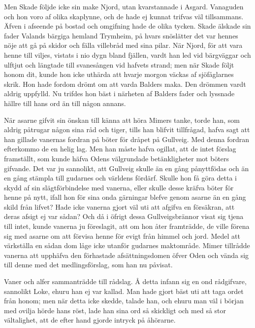 Men Skade följde icke sin make Njord, utan kvarstannade i Asgard.
Vanaguden och hon voro af olika skaplynne, och de hade ej kunnat trifvas
väl tillsammans. Äfven i afseende på bostad och omgifning hade de olika
tycken. Skade älskade sin fader Valands bärgiga hemland Trymheim, på
hvars snöslätter det var hennes nöje att gå på skidor och fälla
villebråd med sina pilar. När Njord, för att vara henne till viljes,
vistats i nio dygn bland fjällen, vardt han led vid bärgväggar och
ulftjut och längtade till svanesången vid hafvets strand; men när Skade
följt honom dit, kunde hon icke uthärda att hvarje morgon väckas af
sjöfåglarnes skrik. Hon hade fordom drömt om att varda Balders maka. Den
drömmen vardt aldrig uppfylld. Nu trifdes hon bäst i närheten af Balders
fader och lyssnade hällre till hans ord än till någon annans.

När asarne gifvit sin önskan till känna att höra Mimers tanke, torde
han, som aldrig påtrugar någon sina råd och tiger, tills han blifvit
tillfrågad, hafva sagt att han gillade vanernas fordran på böter för
dråpet på Gullveig. Med denna fordran efterkommo de en helig lag. Men
han måste hafva ogillat, att de intet förslag framställt, som kunde
häfva Odens välgrundade betänkligheter mot böters gifvande. Det var ju
sannolikt, att Gullveig skulle än en gång pånyttfödas och än en gång
stämpla till gudarnes och världens fördärf. Skulle hon få göra detta i
skydd af sin slägtförbindelse med vanerna, eller skulle desse kräfva
böter för henne på nytt, ifall hon för sina onda gärningar blefve genom
asarne än en gång
skild från lifvet? Hade icke vanerna gjort väl uti att afgifva en
försäkran, att deras afsigt ej var sådan? Och då i öfrigt dessa
Gullveigsbrännor visat sig tjena till intet, kunde vanerna ju
föreslagit, att om hon åter framträdde, de ville förena sig med asarne
om att förvisa henne för evigt från himmel och jord. Medel att
värkställa en sådan dom låge icke utanför gudarnes maktområde. Mimer
tillrådde vanerna att upphäfva den förhastade afsättningsdomen öfver
Oden och vända sig till denne med det medlingsförslag, som han nu
påvisat.

Vaner och alfer sammanträdde till rådslag. Å detta infann sig en ond
rådgifvare, sannolikt Loke, ehuru han ej var kallad. Man hade gjort bäst
uti att taga ordet från honom; men när detta icke skedde, talade han,
och ehuru man väl i början med ovilja hörde hans röst, lade han sina ord
så skickligt och med så stor vältalighet, att de efter hand gjorde
intryck på åhörarne.

